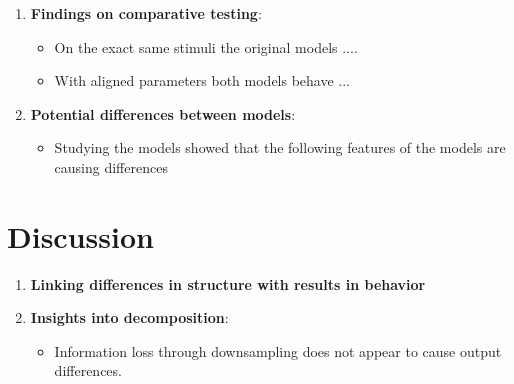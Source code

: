\begin{enumerate}
    \item \textbf{Findings on comparative testing}:
    \begin{itemize}
        \item On the exact same stimuli the original models ....
        \item With aligned parameters both models behave ...
    \end{itemize}

    \item \textbf{Potential differences between models}:
    \begin{itemize}
        \item Studying the models showed that the following features of the models are causing differences
    \end{itemize}

\end{enumerate}

\newpage

\section{Discussion} 
\begin{enumerate}
    \item \textbf{Linking differences in structure with results in behavior}
    \item \textbf{Insights into decomposition}:
    \begin{itemize}
        \item Information loss through downsampling does not appear to cause output differences.
    \end{itemize}
\end{enumerate}



\newpage
\nocite{Adelson1996}
\nocite{Brainard2003-BRACCD-2}
\nocite{Hanson1978}
\nocite{Murray2021}
\nocite{Kingdom2014}
\nocite{Robinson2007}
\vspace*{1cm}
\begin{minipage}{1\textwidth}
\printbibliography
\end{minipage}



